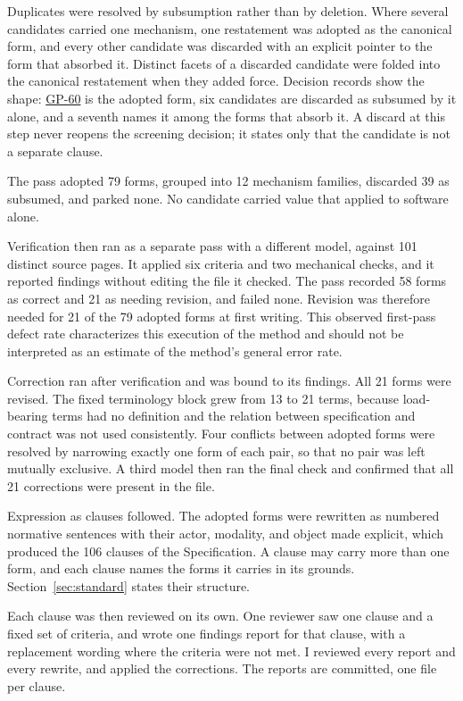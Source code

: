 Duplicates were resolved by subsumption rather than by deletion. Where several candidates carried one mechanism, one restatement was adopted as the canonical form, and every other candidate was discarded with an explicit pointer to the form that absorbed it. Distinct facets of a discarded candidate were folded into the canonical restatement when they added force. Decision records show the shape: \hyperlink{gp-60}{GP-60} is the adopted form, six candidates are discarded as subsumed by it alone, and a seventh names it among the forms that absorb it. A discard at this step never reopens the screening decision; it states only that the candidate is not a separate clause.

The pass adopted 79 forms, grouped into 12 mechanism families, discarded 39 as subsumed, and parked none. No candidate carried value that applied to software alone.

Verification then ran as a separate pass with a different model, against 101 distinct source pages. It applied six criteria and two mechanical checks, and it reported findings without editing the file it checked. The pass recorded 58 forms as correct and 21 as needing revision, and failed none. Revision was therefore needed for 21 of the 79 adopted forms at first writing. This observed first-pass defect rate characterizes this execution of the method and should not be interpreted as an estimate of the method's general error rate.

Correction ran after verification and was bound to its findings. All 21 forms were revised. The fixed terminology block grew from 13 to 21 terms, because load-bearing terms had no definition and the relation between specification and contract was not used consistently. Four conflicts between adopted forms were resolved by narrowing exactly one form of each pair, so that no pair was left mutually exclusive. A third model then ran the final check and confirmed that all 21 corrections were present in the file.

Expression as clauses followed. The adopted forms were rewritten as numbered normative sentences with their actor, modality, and object made explicit, which produced the 106 clauses of the Specification. A clause may carry more than one form, and each clause names the forms it carries in its grounds. Section~\ref{sec:standard} states their structure.

Each clause was then reviewed on its own. One reviewer saw one clause and a fixed set of criteria, and wrote one findings report for that clause, with a replacement wording where the criteria were not met. I reviewed every report and every rewrite, and applied the corrections. The reports are committed, one file per clause.

